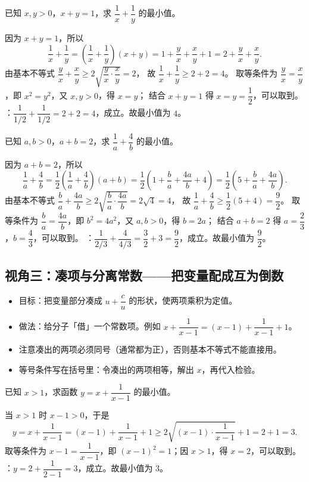 \begin{explore}
\begin{example}
已知 $x,y>0$，$x+y=1$，求 $\dfrac1x+\dfrac1y$ 的最小值。
\end{example}
\begin{solution}
因为 $x+y=1$，所以
\[
  \frac1x+\frac1y=\left(\frac1x+\frac1y\right)(x+y)
  =1+\frac yx+\frac xy+1=2+\frac yx+\frac xy.
\]
由基本不等式 $\dfrac yx+\dfrac xy\geq2\sqrt{\dfrac yx\cdot\dfrac xy}=2$，
故 $\dfrac1x+\dfrac1y\geq2+2=4$。
取等条件为 $\dfrac yx=\dfrac xy$，即 $x^2=y^2$，又 $x,y>0$，得 $x=y$；
结合 $x+y=1$ 得 $x=y=\dfrac12$，可以取到。
：$\dfrac1{1/2}+\dfrac1{1/2}=2+2=4$，成立。故最小值为 $4$。
\end{solution}

\begin{problem}
已知 $a,b>0$，$a+b=2$，求 $\dfrac1a+\dfrac4b$ 的最小值。
\end{problem}
\begin{solution}
因为 $a+b=2$，所以
\[
  \frac1a+\frac4b=\frac12\left(\frac1a+\frac4b\right)(a+b)
  =\frac12\left(1+\frac ba+\frac{4a}b+4\right)
  =\frac12\left(5+\frac ba+\frac{4a}b\right).
\]
由基本不等式 $\dfrac ba+\dfrac{4a}b\geq2\sqrt{\dfrac ba\cdot\dfrac{4a}b}=2\sqrt4=4$，
故 $\dfrac1a+\dfrac4b\geq\dfrac12(5+4)=\dfrac92$。
取等条件为 $\dfrac ba=\dfrac{4a}b$，即 $b^2=4a^2$，又 $a,b>0$，得 $b=2a$；
结合 $a+b=2$ 得 $a=\dfrac23$，$b=\dfrac43$，可以取到。
：$\dfrac1{2/3}+\dfrac4{4/3}=\dfrac32+3=\dfrac92$，成立。故最小值为 $\dfrac92$。
\end{solution}

\subsection{视角三：凑项与分离常数——把变量配成互为倒数}

\begin{itemize}
  \item 目标：把变量部分凑成 $u+\dfrac{c}{u}$ 的形状，使两项乘积为定值。
  \item 做法：给分子「借」一个常数项。例如
        $x+\dfrac{1}{x-1}=(x-1)+\dfrac{1}{x-1}+1$。
  \item 注意凑出的两项必须同号（通常都为正），否则基本不等式不能直接用。
  \item 等号条件写在括号里：令凑出的两项相等，解出 $x$，再代入检验。
\end{itemize}

\begin{example}
已知 $x>1$，求函数 $y=x+\dfrac{1}{x-1}$ 的最小值。
\end{example}
\begin{solution}
当 $x>1$ 时 $x-1>0$，于是
\[
  y=x+\frac{1}{x-1}=(x-1)+\frac{1}{x-1}+1
  \geq2\sqrt{(x-1)\cdot\frac{1}{x-1}}+1=2+1=3.
\]
取等条件为 $x-1=\dfrac{1}{x-1}$，即 $(x-1)^2=1$；因 $x>1$，得 $x=2$，可以取到。
：$y=2+\dfrac1{2-1}=3$，成立。故最小值为 $3$。
\end{solution}


\end{explore}
